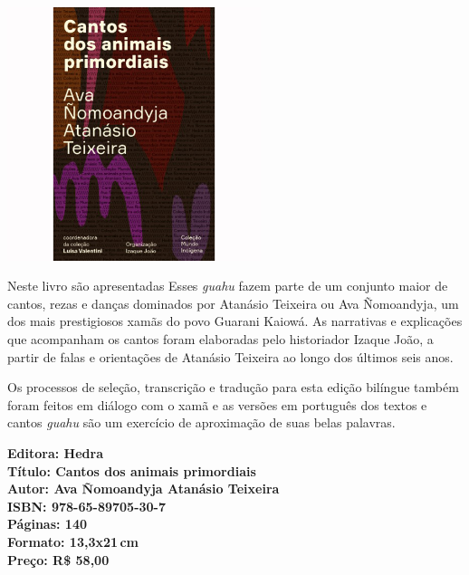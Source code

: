 \begin{center}
\hspace*{.5cm}\includegraphics[width=74mm]{./CAPAS/HEDRA_CANTOS.jpg}
\end{center}
\hspace*{-7cm}\hrulefill\hspace*{-7cm}
\medskip

\noindent{}Neste livro são apresentadas  Esses \textit{guahu} fazem parte de um conjunto maior de cantos, rezas e danças dominados por Atanásio Teixeira ou Ava Ñomoandyja, um dos mais prestigiosos xamãs do povo Guarani Kaiowá. As narrativas e explicações que acompanham os cantos foram elaboradas pelo historiador Izaque João, a partir de falas e orientações de Atanásio Teixeira ao longo dos últimos seis anos. 

Os processos de seleção, transcrição e tradução para esta edição bilíngue também foram feitos em diálogo com o xamã e as versões em português dos textos e cantos \textit{guahu} são um exercício de aproximação de suas belas palavras.

\vfill
\noindent\begin{minipage}[c]{1\linewidth}
{\small\textbf{
\hspace*{-.1cm}Editora: Hedra\\
Título: Cantos dos animais primordiais\\
Autor: Ava Ñomoandyja Atanásio Teixeira\\ 
ISBN: 978-65-89705-30-7\\
Páginas: 140\\
Formato: 13,3x21\,cm\\
Preço: R\$ 58,00\\
}}
\end{minipage}
\pagebreak


